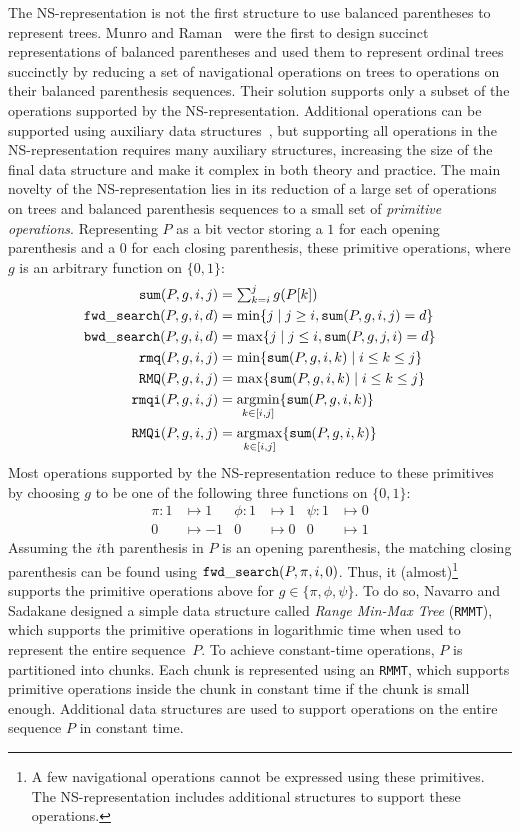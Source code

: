The NS-representation is not the first structure to use balanced
parentheses to represent trees.  Munro and Raman~\cite{mr1997} were
the first to design succinct representations of balanced parentheses
and used them to represent ordinal trees succinctly by reducing a set
of navigational operations on trees to operations on their balanced
parenthesis sequences.  Their solution supports only a subset of the
operations supported by the NS-representation.  Additional operations
can be supported using auxiliary data structures~\cite{ly2008}, but
supporting all operations in the NS-representation requires many
auxiliary structures, increasing the size of the final data structure
and make it complex in both theory and practice.  The main novelty of
the NS-representation lies in its reduction of a large set of
operations on trees and balanced parenthesis sequences to a small set
of \emph{primitive operations}.  Representing $P$ as a bit vector
storing a $1$ for each opening parenthesis and a $0$ for each closing
parenthesis, these primitive operations, where $g$ is an arbitrary
function on $\{0,1\}$:
  \begin{align*}
    \mathtt{sum}(P,g,i,j) &= \textstyle\sum_{k=i}^jg(P[k])\\
    \mathtt{fwd\_search}(P,g,i,d) &= \min\{j \mid j \ge i, \mathtt{sum}(P,g,i,j) = d\}\\
    \mathtt{bwd\_search}(P,g,i,d) &= \max\{j \mid j \le i, \mathtt{sum}(P,g,j,i) = d\}\\
    \mathtt{rmq}(P,g,i,j) &= \min\{\mathtt{sum}(P,g,i,k) \mid i\le k\le j\}\\
    \mathtt{RMQ}(P,g,i,j) &= \max\{\mathtt{sum}(P,g,i,k) \mid i\le k\le j\}\\
    \mathtt{rmqi}(P,g,i,j) &= \operatorname*{arg\!\min}_{k\in[i,j]}\{\mathtt{sum}(P,g,i,k)\}\\
    \mathtt{RMQi}(P,g,i,j) &= \operatorname*{arg\!\max}_{k\in[i,j]}\{\mathtt{sum}(P,g,i,k)\}
  \end{align*}
Most operations supported by the NS-representation reduce to these primitives
by choosing $g$ to be one of the following three functions on $\{0,1\}$:
\begin{align*}
\pi : 1 &\mapsto 1 &\phi : 1 &\mapsto 1 & \psi : 1 &\mapsto 0\\
0 &\mapsto -1 & 0 &\mapsto 0 & 0 &\mapsto 1
\end{align*}
Assuming the $i$th parenthesis in $P$ is an opening parenthesis, the
matching closing parenthesis can be found using
$\mathtt{fwd\_search}(P,\pi,i,0)$.  Thus, it (almost)\footnote{A few
  navigational operations cannot be expressed using these primitives.
  The NS-representation includes additional structures to support
  these operations.}  supports the primitive operations above for
$g \in \{\pi, \phi, \psi\}$.  To do so, Navarro and Sadakane designed
a simple data structure called \emph{Range Min-Max Tree} ({\tt RMMT}),
which supports the primitive operations in logarithmic time when used
to represent the entire sequence~$P$.  To achieve constant-time
operations, $P$ is partitioned into chunks.  Each chunk is represented
using an {\tt RMMT}, which supports primitive operations inside the
chunk in constant time if the chunk is small enough.  Additional data
structures are used to support operations on the entire sequence $P$
in constant time.

